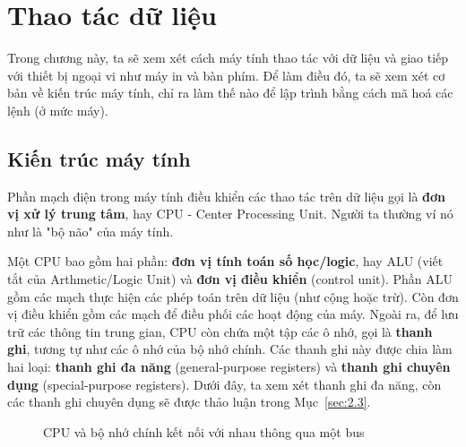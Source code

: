 
\chapter{Thao tác dữ liệu}
\label{chap:ch3}

\minitoc
\vspace{0.5cm}
\noindent
Trong chương này, ta sẽ xem xét cách máy tính thao tác với dữ liệu và giao tiếp với thiết
bị ngoại vi như máy in và bàn phím. Để làm điều đó, ta sẽ xem xét cơ bản về kiến trúc máy
tính, chỉ ra làm thế nào để lập trình bằng cách mã hoá các lệnh (ở mức máy).


\section{Kiến trúc máy tính}
Phần mạch điện trong máy tính điều khiển các thao tác trên dữ liệu gọi là \textbf{đơn vị
  xử lý trung tâm}, hay CPU - Center Processing Unit.  Người ta thường ví nó như là "bộ
não" của máy tính.
 

Một CPU bao gồm hai phần: \textbf{đơn vị tính toán số học/logic}, hay ALU (viết tắt của
Arthmetic/Logic Unit) và \textbf{đơn vị điều khiển} (control unit). Phần ALU gồm các mạch
thực hiện các phép toán trên dữ liệu (như cộng hoặc trừ). Còn đơn vị điều khiển gồm các
mạch để điều phối các hoạt động của máy. Ngoài ra, để lưu trữ các thông tin trung gian,
CPU còn chứa một tập các ô nhớ, gọi là \textbf{thanh ghi}, tương tự như các ô nhớ của bộ
nhớ chính. Các thanh ghi này được chia làm hai loại: \textbf{thanh ghi đa năng}
(general-purpose registers) và \textbf{thanh ghi chuyên dụng} (special-purpose
registers). Dưới đây, ta xem xét thanh ghi đa năng, còn các thanh ghi chuyên dụng sẽ được
thảo luận trong Mục~\ref{sec:2.3}.

\begin{figure}
  \centering {}
  \caption{CPU và bộ nhớ chính kết nối với nhau thông qua một bus}
  \label{fig:fig21}
\end{figure}

